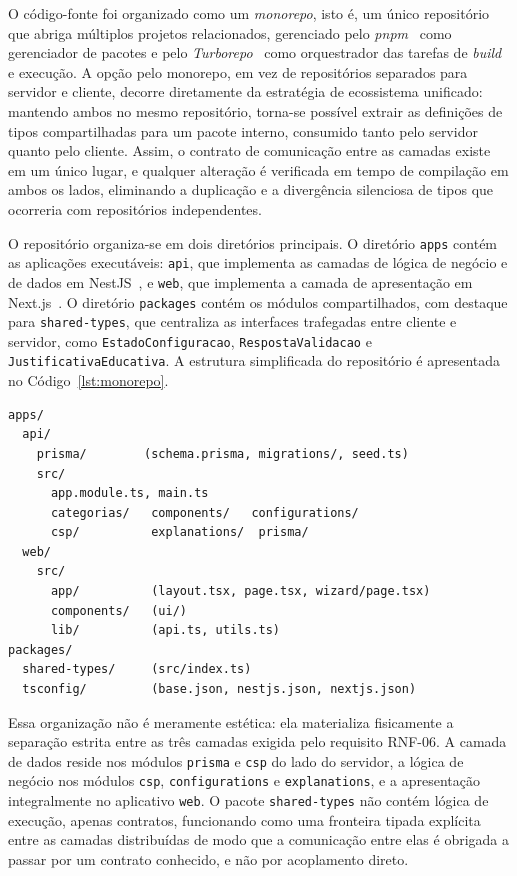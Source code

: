 O código-fonte foi organizado como um \textit{monorepo}, isto é, um único repositório que abriga múltiplos projetos relacionados, gerenciado pelo \textit{pnpm}~\cite{Pnpm} como gerenciador de pacotes e pelo \textit{Turborepo}~\cite{Turborepo} como orquestrador das tarefas de \textit{build} e execução. A opção pelo monorepo, em vez de repositórios separados para servidor e cliente, decorre diretamente da estratégia de ecossistema unificado: mantendo ambos no mesmo repositório, torna-se possível extrair as definições de tipos compartilhadas para um pacote interno, consumido tanto pelo servidor quanto pelo cliente. Assim, o contrato de comunicação entre as camadas existe em um único lugar, e qualquer alteração é verificada em tempo de compilação em ambos os lados, eliminando a duplicação e a divergência silenciosa de tipos que ocorreria com repositórios independentes.

O repositório organiza-se em dois diretórios principais. O diretório \texttt{apps} contém as aplicações executáveis: \texttt{api}, que implementa as camadas de lógica de negócio e de dados em NestJS~\cite{NestJS}, e \texttt{web}, que implementa a camada de apresentação em Next.js~\cite{NextJS}. O diretório \texttt{packages} contém os módulos compartilhados, com destaque para \texttt{shared-types}, que centraliza as interfaces trafegadas entre cliente e servidor, como \texttt{EstadoConfiguracao}, \texttt{RespostaValidacao} e \texttt{JustificativaEducativa}. A estrutura simplificada do repositório é apresentada no Código~\ref{lst:monorepo}.

\begin{lstlisting}[caption={Estrutura simplificada do monorepo},label={lst:monorepo},basicstyle=\ttfamily\small]
apps/
  api/
    prisma/        (schema.prisma, migrations/, seed.ts)
    src/
      app.module.ts, main.ts
      categorias/   components/   configurations/
      csp/          explanations/  prisma/
  web/
    src/
      app/          (layout.tsx, page.tsx, wizard/page.tsx)
      components/   (ui/)
      lib/          (api.ts, utils.ts)
packages/
  shared-types/     (src/index.ts)
  tsconfig/         (base.json, nestjs.json, nextjs.json)
\end{lstlisting}

Essa organização não é meramente estética: ela materializa fisicamente a separação estrita entre as três camadas exigida pelo requisito RNF-06. A camada de dados reside nos módulos \texttt{prisma} e \texttt{csp} do lado do servidor, a lógica de negócio nos módulos \texttt{csp}, \texttt{configurations} e \texttt{explanations}, e a apresentação integralmente no aplicativo \texttt{web}. O pacote \texttt{shared-types} não contém lógica de execução, apenas contratos, funcionando como uma fronteira tipada explícita entre as camadas distribuídas de modo que a comunicação entre elas é obrigada a passar por um contrato conhecido, e não por acoplamento direto.

